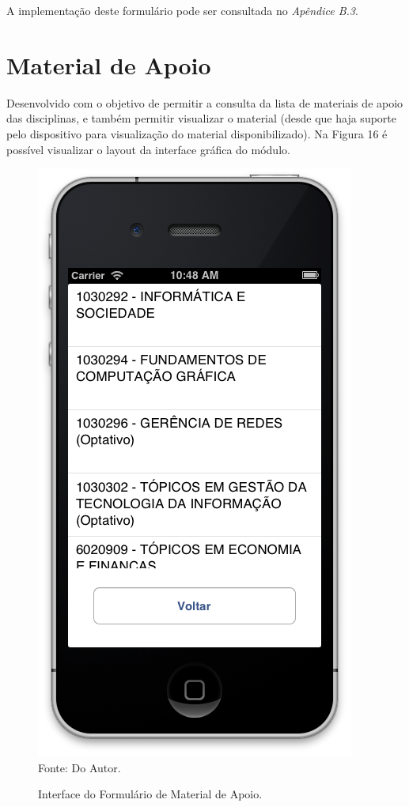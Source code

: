 A implementação deste formulário pode ser consultada no \emph{Apêndice B.3}.


\section{Material de Apoio}
Desenvolvido com o objetivo de permitir a consulta da lista de materiais de apoio das disciplinas, e também permitir visualizar o material (desde que haja suporte pelo dispositivo para visualização do material disponibilizado). Na Figura 16 é possível visualizar o layout da interface gráfica do módulo.

\begin{figure}[!htb]
     \centering
     \caption[Formulário Material de Apoio - Interface]{Interface do Formulário de Material de Apoio.}
     \includegraphics[scale=0.34]{imagens/formmaterialapoio.png}
     \\  Fonte: Do Autor.
\end{figure}

